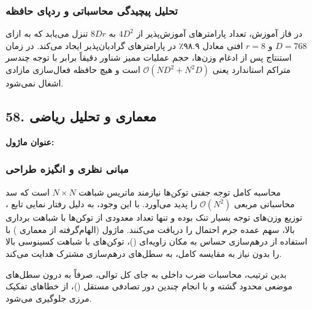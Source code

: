 \subsubsection*{تحلیل پیچیدگی محاسباتی و ردپای حافظه}
در فاز آموزش، تعداد پارامترهای آموزش‌پذیر از $4 D^2$ به $8 D r$ تنزل می‌یابد که به ازای $D = 768$ و $r = 8$ افتی معادل ۹۸.۹٪ در پارامترهای گرادیان‌پذیر ایجاد می‌کند. در زمان استنتاج پس از ادغام وزن‌ها، حجم عملیات ممیز شناور دقیقاً برابر با توجه چندسر متراکم استاندارد یعنی $\mathcal{O}(N D^2 + N^2 D)$ است و هیچ حافظه فعال‌سازی مازادی اشغال نمی‌شود.


\subsection*{58. معماری و تحلیل ریاضی }
\textbf{عنوان ماژول:} 

\subsubsection*{مبانی نظری و انگیزه طراحی}
محاسبه کامل توجه جفتی توکن‌ها نیازمند ماتریس شباهت $N \times N$ است که سد محاسباتی مربعی $\mathcal{O}(N^2)$ را پدید می‌آورد. با این وجود، به دلیل رفتار نمایی تابع ، توزیع وزن‌های توجه بسیار تنک بوده و تنها تعداد معدودی از توکن‌ها با شباهت برداری بالا، سهم عمده جرم احتمال را دریافت می‌کنند. ماژول  (الهام‌گرفته از معماری ) با استفاده از درهم‌سازی حساس به مکان زاویه‌ای ()، توکن‌های با شباهت کسینوسی بالا را بدون نیاز به مقایسه کامل، به سطل‌های درهم‌سازی مشترک هدایت می‌کند.

بدین ترتیب، محاسبات ضرب داخلی به جای کل توالی، صرفاً به درون سطل‌های موضعی محدود گشته و با انجام چندین دور تصادفی مستقل ()، از خطاهای تفکیک مرزی جلوگیری می‌شود.

